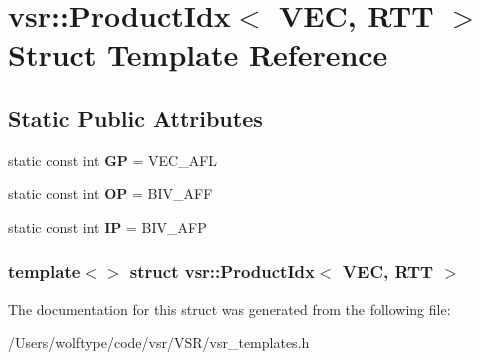 \hypertarget{structvsr_1_1_product_idx_3_01_v_e_c_00_01_r_t_t_01_4}{\section{vsr\-:\-:Product\-Idx$<$ V\-E\-C, R\-T\-T $>$ Struct Template Reference}
\label{structvsr_1_1_product_idx_3_01_v_e_c_00_01_r_t_t_01_4}
}
\subsection*{Static Public Attributes}
\begin{DoxyCompactItemize}
\item 
\hypertarget{structvsr_1_1_product_idx_3_01_v_e_c_00_01_r_t_t_01_4_a3359629480361a2ea4475bb294f42081}{static const int {\bfseries G\-P} = V\-E\-C\-\_\-\-A\-F\-L}\label{structvsr_1_1_product_idx_3_01_v_e_c_00_01_r_t_t_01_4_a3359629480361a2ea4475bb294f42081}

\item 
\hypertarget{structvsr_1_1_product_idx_3_01_v_e_c_00_01_r_t_t_01_4_ae093ba5630d18c85c1127173b8a0c912}{static const int {\bfseries O\-P} = B\-I\-V\-\_\-\-A\-F\-F}\label{structvsr_1_1_product_idx_3_01_v_e_c_00_01_r_t_t_01_4_ae093ba5630d18c85c1127173b8a0c912}

\item 
\hypertarget{structvsr_1_1_product_idx_3_01_v_e_c_00_01_r_t_t_01_4_a24b3e53a62542911cf758bf31da0b503}{static const int {\bfseries I\-P} = B\-I\-V\-\_\-\-A\-F\-P}\label{structvsr_1_1_product_idx_3_01_v_e_c_00_01_r_t_t_01_4_a24b3e53a62542911cf758bf31da0b503}

\end{DoxyCompactItemize}
\subsubsection*{template$<$$>$ struct vsr\-::\-Product\-Idx$<$ V\-E\-C, R\-T\-T $>$}



The documentation for this struct was generated from the following file\-:\begin{DoxyCompactItemize}
\item 
/\-Users/wolftype/code/vsr/\-V\-S\-R/vsr\-\_\-templates.\-h\end{DoxyCompactItemize}
